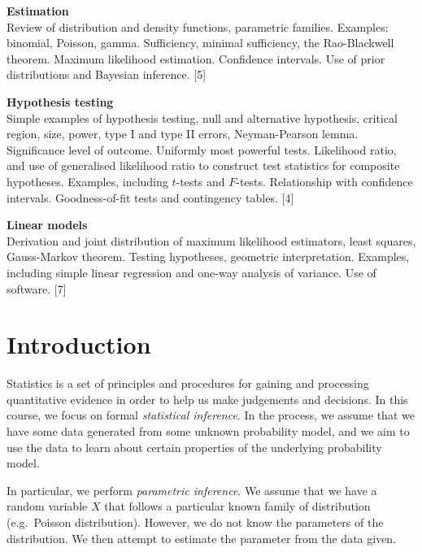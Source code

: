 \documentclass[a4paper]{article}
\begin{document}
\maketitle
{\small
\noindent\textbf{Estimation}\\
Review of distribution and density functions, parametric families. Examples: binomial, Poisson, gamma. Sufficiency, minimal sufficiency, the Rao-Blackwell theorem. Maximum likelihood estimation. Confidence intervals. Use of prior distributions and Bayesian inference.\hspace*{\fill} [5]

\vspace{10pt}
\noindent\textbf{Hypothesis testing}\\
Simple examples of hypothesis testing, null and alternative hypothesis, critical region, size, power, type I and type II errors, Neyman-Pearson lemma. Significance level of outcome. Uniformly most powerful tests. Likelihood ratio, and use of generalised likelihood ratio to construct test statistics for composite hypotheses. Examples, including $t$-tests and $F$-tests. Relationship with confidence intervals. Goodness-of-fit tests and contingency tables.\hspace*{\fill} [4]

\vspace{10pt}
\noindent\textbf{Linear models}\\
Derivation and joint distribution of maximum likelihood estimators, least squares, Gauss-Markov theorem. Testing hypotheses, geometric interpretation. Examples, including simple linear regression and one-way analysis of variance. Use of software.\hspace*{\fill} [7]}

\tableofcontents

\setcounter{section}{-1}
\section{Introduction}
Statistics is a set of principles and procedures for gaining and processing quantitative evidence in order to help us make judgements and decisions. In this course, we focus on formal \emph{statistical inference}. In the process, we assume that we have some data generated from some unknown probability model, and we aim to use the data to learn about certain properties of the underlying probability model.

In particular, we perform \emph{parametric inference}. We assume that we have a random variable $X$ that follows a particular known family of distribution (e.g.\ Poisson distribution). However, we do not know the parameters of the distribution. We then attempt to estimate the parameter from the data given.
\end{document}
